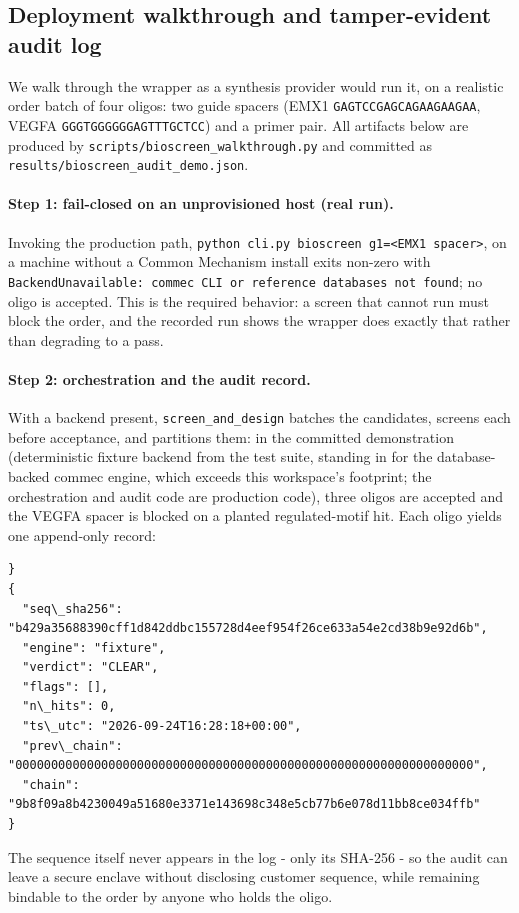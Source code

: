 \documentclass[12pt]{article}
\begin{document}
\subsection{Deployment walkthrough and tamper-evident audit log}
\label{sec:tool9-walkthrough}
We walk through the wrapper as a synthesis provider would run it, on a
realistic order batch of four oligos: two guide spacers (EMX1
\texttt{GAGTCCGAGCAGAAGAAGAA}, VEGFA \texttt{GGGTGGGGGGAGTTTGCTCC}) and a
primer pair. All artifacts below are produced by
\texttt{scripts/bioscreen\_walkthrough.py} and committed as
\texttt{results/bioscreen\_audit\_demo.json}.

\paragraph{Step 1: fail-closed on an unprovisioned host (real run).}
Invoking the production path, \texttt{python cli.py bioscreen
g1=<EMX1 spacer>}, on a machine without a Common Mechanism install exits
non-zero with \texttt{BackendUnavailable: commec CLI or reference databases
not found}; no oligo is accepted. This is the required behavior: a screen
that cannot run must block the order, and the recorded run shows the wrapper
does exactly that rather than degrading to a pass.

\paragraph{Step 2: orchestration and the audit record.}
With a backend present, \texttt{screen\_and\_design} batches the candidates,
screens each before acceptance, and partitions them: in the committed
demonstration (deterministic fixture backend from the test suite, standing
in for the database-backed commec engine, which exceeds this workspace's
footprint; the orchestration and audit code are production code), three
oligos are accepted and the VEGFA spacer is blocked on a planted
regulated-motif hit. Each oligo yields one append-only record:
{\footnotesize\begin{verbatim}}
{
  "seq\_sha256": "b429a35688390cff1d842ddbc155728d4eef954f26ce633a54e2cd38b9e92d6b",
  "engine": "fixture",
  "verdict": "CLEAR",
  "flags": [],
  "n\_hits": 0,
  "ts\_utc": "2026-09-24T16:28:18+00:00",
  "prev\_chain": "0000000000000000000000000000000000000000000000000000000000000000",
  "chain": "9b8f09a8b4230049a51680e3371e143698c348e5cb77b6e078d11bb8ce034ffb"
}
\end{verbatim}}
The sequence itself never appears in the log - only its SHA-256 - so the
audit can leave a secure enclave without disclosing customer sequence, while
remaining bindable to the order by anyone who holds the oligo.
\end{document}
